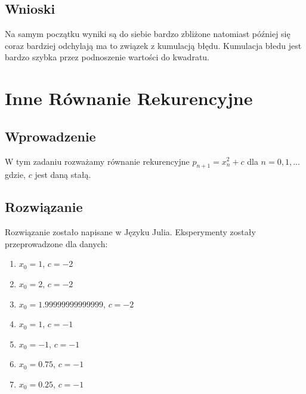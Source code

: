 \documentclass{article}
\begin{document}
\subsection{Wnioski}
Na samym początku wyniki są do siebie bardzo zbliżone natomiast później się coraz bardziej odchylają ma to związek z kumulacją błędu. Kumulacja błedu jest bardzo szybka przez podnoszenie wartości do kwadratu.
\section{Inne Równanie Rekurencyjne}
    \subsection{Wprowadzenie}
    W tym zadaniu rozważamy równanie rekurencyjne
    $p_{n+1} = x^2_n + c$ dla $n = 0,1,...$ gdzie, $c$ jest daną stałą. 
    \subsection{Rozwiązanie}
    Rozwiązanie zostało napisane w Języku Julia. Eksperymenty zostały przeprowadzone dla danych: 
    \begin{enumerate}
        \item $x_0 = 1$, $c = -2$
        \item $x_0 = 2$, $c = -2$
        \item $x_0 = 1.99999999999999$, $c = -2$
        \item $x_0 = 1$, $c = -1$
        \item $x_0 = -1$, $c = -1$
        \item $x_0 = 0.75$, $c = -1$
        \item $x_0 = 0.25$, $c = -1$
    \end{enumerate}
\end{document}
